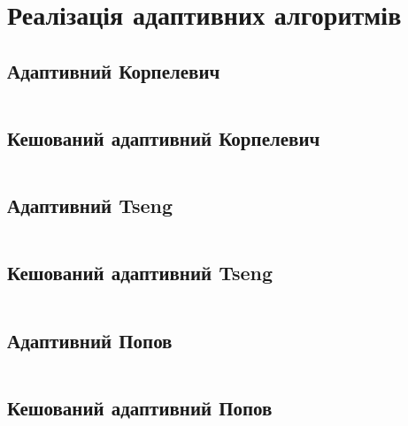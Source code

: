 \section{Реалізація адаптивних алгоритмів}

\subsection{Адаптивний Корпелевич}
\inputminted[linenos,fontsize=\tiny]{python}{src/adaptive_korpelevich.py}
\newpage

\subsection{Кешований адаптивний Корпелевич}
\inputminted[linenos,fontsize=\tiny]{python}{src/cached_adaptive_korpelevich.py}
\newpage

\subsection{Адаптивний Tseng}
\inputminted[linenos,fontsize=\tiny]{python}{src/adaptive_tseng.py}
\newpage

\subsection{Кешований адаптивний Tseng}
\inputminted[linenos,fontsize=\tiny]{python}{src/cached_adaptive_tseng.py}
\newpage

\subsection{Адаптивний Попов}
\inputminted[linenos,fontsize=\tiny]{python}{src/adaptive_popov.py}
\newpage

\subsection{Кешований адаптивний Попов}
\inputminted[linenos,fontsize=\tiny]{python}{src/cached_adaptive_popov.py}
